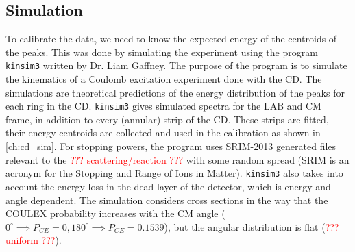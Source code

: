 \documentclass[twoside,english]{uiofysmaster/uiofysmaster}
\let\orgautoref\autoref
\renewcommand{\autoref}
        {%
		 \def\sectionautorefname{Section}%
		 \def\subsectionautorefname{Section}%
		 \def\subsubsectionautorefname{Section}%
		 \def\chapterautorefname{Chapter}%
          \orgautoref}
\begin{document}


\subsection{Simulation}\label{ssec:kinsim}


To calibrate the data, we need to know the expected energy of the centroids of the peaks. 
This was done by simulating the experiment using the program \texttt{kinsim3} \cite{kinsim} written by Dr. Liam Gaffney. 
The purpose of the program is to simulate the kinematics of a Coulomb excitation experiment done with the CD. 
The simulations are theoretical predictions of the energy distribution of the peaks for each ring in the CD. 
\texttt{kinsim3} gives simulated spectra for the LAB and CM frame, in addition to every (annular) strip of the CD.
These strips are fitted, their energy centroids are collected and used in the calibration as shown in \autoref{ch:cd_sim}.
For stopping powers, the program uses SRIM-2013 \cite{SRIM} generated files relevant to the \textcolor{red}{??? scattering/reaction ???} with some random spread (SRIM is an acronym for the Stopping and Range of Ions in Matter).
\texttt{kinsim3} also takes into account the energy loss in the dead layer of the detector, which is energy and angle dependent. 
The simulation considers cross sections in the way that the COULEX probability increases with the CM angle ($0^\circ \implies P_{CE} = 0, 180^\circ \implies P_{CE} = 0.1539$), but the angular distribution is flat (\textcolor{red}{??? uniform ???}). 
\end{document}
